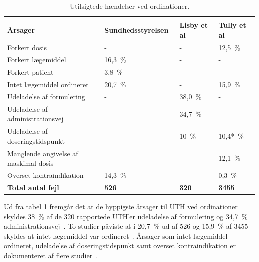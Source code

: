 	\vspace{2mm}
\begin{longtable}{p{5cm}|p{4.2cm}|p{2cm}|p{2cm}}
	\caption{Utilsigtede hændelser ved ordinationer.}
	\vspace{2mm}
	\label{table:UTHordination} \\
\cellcolor[HTML]{C0C0C0} {\textbf{Årsager}} & 
{\cellcolor[HTML]{C0C0C0}\textbf{Sundhedsstyrelsen~\citep{Sundhedsstyrelsen2005}}} &
{\cellcolor[HTML]{C0C0C0}\textbf{Lisby et al~\citep{Lisby2005}}} &
{\cellcolor[HTML]{C0C0C0}\textbf{Tully et al~\citep{Tully2009}}} \\ \hline
Forkert dosis & - & - & 12,5~\%  \\ \hline %
Forkert lægemiddel & 16,3~\% & - & - \\ \hline %
Forkert patient & 3,8~\% & - & - \\ \hline %
Intet lægemiddel ordineret & 20,7~\% & - & 15,9~\% \\ \hline %
Udeladelse af formulering & - & 38,0~\% & - \\ \hline %
Udeladelse af administrationsvej & - & 34,7~\% & - \\ \hline %
Udeladelse af doseringstidspunkt & - & 10~\% & 10,4*~\% \\ \hline %
Manglende angivelse af maskimal dosis & - & - & 12,1~\% \\ \hline %
Overset kontraindikation & 14,3~\% & - & 0,3~\% \\ \hline %
\cellcolor[HTML]{C0C0C0} {\textbf{Total antal fejl}} & 
{\cellcolor[HTML]{C0C0C0}\textbf{526}} &
{\cellcolor[HTML]{C0C0C0}\textbf{320}} &
{\cellcolor[HTML]{C0C0C0}\textbf{3455}}
\end{longtable}

Ud fra tabel \ref{table:UTHordination} fremgår det at de hyppigste årsager til UTH ved ordinationer skyldes 38~\% af de 320 rapportede UTH'er udeladelse af formulering og 34,7~\% administrationsvej~\citep{Lisby2005}. To studier påviste at i 20,7~\% ud af 526 og 15,9~\% af 3455 skyldes at intet lægemiddel var ordineret~\citep{Sundhedsstyrelsen2005, Tully2009}. Årsager som intet lægemiddel ordineret, udeladelse af doseringstidspunkt samt overset kontraindikation er dokumenteret af flere studier~\citep{Sundhedsstyrelsen2005, Lisby2005, Tully2009}. 

